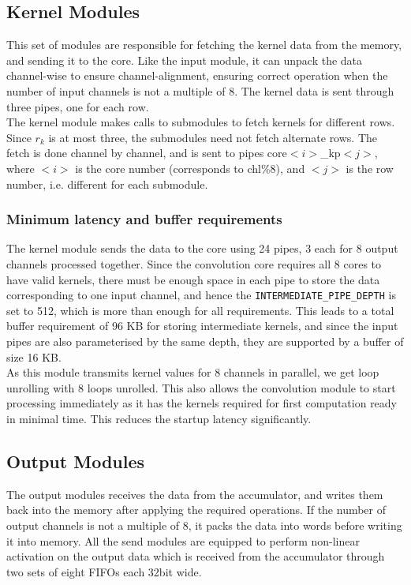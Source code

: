 \documentclass[a4paper,12pt, final]{report}
\begin{document}
\subsection{Kernel Modules}

This set of modules are responsible for fetching the kernel data from the memory, and sending it to the core. Like the input module, it can unpack the data channel-wise to ensure channel-alignment, ensuring correct operation when the number of input channels is not a multiple of 8. The kernel data is sent through three pipes, one for each row.
\\

The kernel module makes calls to submodules to fetch kernels for different rows. Since $r_k$ is at most three, the submodules need not fetch alternate rows. The fetch is done channel by channel, and is sent to pipes core$<i>$\_kp$<j>$, where $<i>$ is the core number (corresponds to chl\%8), and $<j>$ is the row number, i.e. different for each submodule.

\subsubsection{Minimum latency and buffer requirements}

The kernel module sends the data to the core using 24 pipes, 3 each for 8 output channels processed together. Since the convolution core requires all 8 cores to have valid kernels, there must be enough space in each pipe to store the data corresponding to one input channel, and hence the \verb|INTERMEDIATE_PIPE_DEPTH| is set to 512, which is more than enough for all requirements. This leads to a total buffer requirement of 96 KB for storing intermediate kernels, and since the input pipes are also parameterised by the same depth, they are supported by a buffer of size 16 KB.
\\

As this module transmits kernel values for 8 channels in parallel, we get loop unrolling with 8 loops unrolled. This also allows the convolution module to start processing immediately as it has the kernels required for first computation ready in minimal time. This reduces the startup latency significantly.

\subsection{Output Modules}

The output modules receives the data from the accumulator, and writes them back into the memory after applying the required operations. If the number of output channels is not a multiple of 8, it packs the data into words before writing it into memory. All the send modules are equipped to perform non-linear activation on the output data which is received from the accumulator through two sets of eight FIFOs each 32bit wide.
\end{document}
